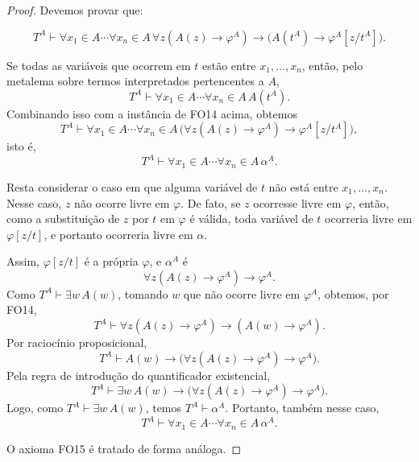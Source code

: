 \begin{proof}
    Devemos provar que:

    \[
        T^A\vdash\forall x_1\in A\cdots \forall x_n\in A\,
        \forall z(A(z)\to\varphi^A)
        \to
        \bigl(A(t^A)\to\varphi^A[z/t^A]\bigr).
    \]

     Se todas as variáveis que ocorrem em $t$ estão entre $x_1,\dots,x_n$, então, pelo metalema sobre termos interpretados pertencentes a $A$,
    \[
        T^A\vdash
        \forall x_1\in A\cdots \forall x_n\in A\, A(t^A).
    \]
    Combinando isso com a instância de FO14 acima, obtemos
    \[
        T^A\vdash
        \forall x_1\in A\cdots \forall x_n\in A\,
        \bigl(\forall z(A(z)\to\varphi^A)\to \varphi^A[z/t^A]\bigr),
    \]
    isto é,
    \[
        T^A\vdash
        \forall x_1\in A\cdots \forall x_n\in A\,\alpha^A.
    \]

    Resta considerar o caso em que alguma variável de $t$ não está entre $x_1,\dots,x_n$.
    Nesse caso, $z$ não ocorre livre em $\varphi$.
    De fato, se $z$ ocorresse livre em $\varphi$, então, como a substituição de $z$ por $t$ em $\varphi$ é válida, toda variável de $t$ ocorreria livre em $\varphi[z/t]$, e portanto ocorreria livre em $\alpha$.

    Assim, $\varphi[z/t]$ é a própria $\varphi$, e $\alpha^A$ é
    \[
        \forall z(A(z)\to\varphi^A)\to\varphi^A.
    \]
    Como $T^A\vdash \exists w\,A(w)$, tomando $w$ que não ocorre livre em $\varphi^A$, obtemos, por FO14,
    \[
        T^A\vdash
        \forall z(A(z)\to\varphi^A)\to(A(w)\to\varphi^A).
    \]
    Por raciocínio proposicional,
    \[
        T^A\vdash
        A(w)\to\bigl(\forall z(A(z)\to\varphi^A)\to\varphi^A\bigr).
    \]
    Pela regra de introdução do quantificador existencial,
    \[
        T^A\vdash
        \exists w\,A(w)\to\bigl(\forall z(A(z)\to\varphi^A)\to\varphi^A\bigr).
    \]
    Logo, como $T^A\vdash \exists w\,A(w)$, temos $T^A\vdash \alpha^A$.
    Portanto, também nesse caso,
    \[
        T^A\vdash
        \forall x_1\in A\cdots \forall x_n\in A\,\alpha^A.
    \]

    O axioma FO15 é tratado de forma análoga.
\end{proof}